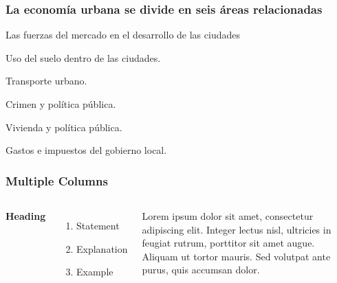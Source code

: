 \documentclass{beamer}
\begin{document}
\begin{frame}
\frametitle{La economía urbana se divide en seis áreas relacionadas}
\begin{block}{Las fuerzas del mercado en el desarrollo de las ciudades}
\end{block}

\begin{block}{Uso del suelo dentro de las ciudades.}
\end{block}

\begin{block}{Transporte urbano.}
\end{block}

\begin{block}{Crimen y política pública.}
\end{block}

\begin{block}{Vivienda y política pública.}
\end{block}

\begin{block}{Gastos e impuestos del gobierno local.}
\end{block}

\end{frame}  

\begin{frame}
\frametitle{Multiple Columns}
\begin{columns}[c] %

\textbf{Heading}
\begin{enumerate}
\item Statement
\item Explanation
\item Example
\end{enumerate}

Lorem ipsum dolor sit amet, consectetur adipiscing elit. Integer lectus nisl, ultricies in feugiat rutrum, porttitor sit amet augue. Aliquam ut tortor mauris. Sed volutpat ante purus, quis accumsan dolor.

\end{columns}
\end{frame}
\end{document}
